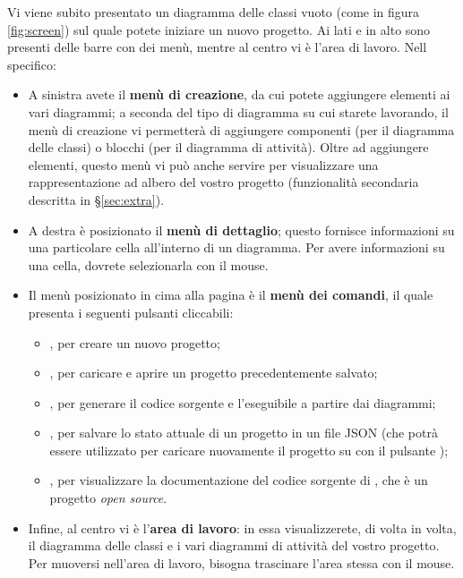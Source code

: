Vi viene subito presentato un diagramma delle classi vuoto (come in figura \ref{fig:screen}) sul quale potete iniziare un nuovo progetto. Ai lati e in alto sono presenti delle barre con dei menù, mentre al centro vi è l'area di lavoro. Nell specifico:
\begin{itemize}
	\item A sinistra avete il \textbf{menù di creazione}, da cui potete aggiungere elementi ai vari diagrammi; a seconda del tipo di diagramma su cui starete lavorando, il menù di creazione vi permetterà di aggiungere componenti (per il diagramma delle classi) o blocchi (per il diagramma di attività). Oltre ad aggiungere elementi, questo menù vi può anche servire per visualizzare una rappresentazione ad albero del vostro progetto (funzionalità secondaria descritta in §\ref{sec:extra}).
	\item A destra è posizionato il \textbf{menù di dettaglio}; questo fornisce informazioni su una particolare cella all'interno di un diagramma. Per avere informazioni su una cella, dovrete selezionarla con il mouse.
	\item Il menù posizionato in cima alla pagina è il \textbf{menù dei comandi}, il quale presenta i seguenti pulsanti cliccabili:
	\begin{itemize}
		\item {}, per creare un nuovo progetto;
		\item {}, per caricare e aprire un progetto precedentemente salvato;
		\item {}, per generare il codice sorgente e l'eseguibile a partire dai diagrammi;
		\item {}, per salvare lo stato attuale di un progetto in un file JSON (che potrà essere utilizzato per caricare nuovamente il progetto su \proj{} con il pulsante );
		\item {}, per visualizzare la documentazione del codice sorgente di \proj, che è un progetto \emph{open source}.
	\end{itemize}
	\item Infine, al centro vi è l'\textbf{area di lavoro}: in essa visualizzerete, di volta in volta, il diagramma delle classi e i vari diagrammi di attività del vostro progetto. Per muoversi nell'area di lavoro, bisogna trascinare l'area stessa con il mouse.
\end{itemize}

